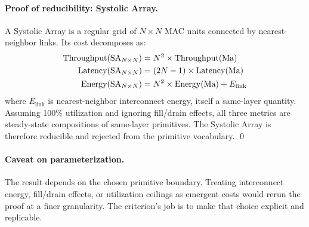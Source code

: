 \paragraph{Proof of reducibility: Systolic Array.} A Systolic Array \citep{kung1982} is a regular grid of $N \times N$ MAC units connected by nearest-neighbor links. Its cost decomposes as:
\begin{align}
\label{eq:systolic-proof}
\text{Throughput}(\text{SA}_{N \times N}) &= N^2 \times \text{Throughput}(\text{Ma}) \\
\text{Latency}(\text{SA}_{N \times N}) &= (2N - 1) \times \text{Latency}(\text{Ma}) \notag \\
\text{Energy}(\text{SA}_{N \times N}) &= N^2 \times \text{Energy}(\text{Ma}) + E_{\text{link}} \notag
\end{align}
where $E_{\text{link}}$ is nearest-neighbor interconnect energy, itself a same-layer quantity. Assuming 100\% utilization and ignoring fill/drain effects, all three metrics are steady-state compositions of same-layer primitives. The Systolic Array is therefore reducible and rejected from the primitive vocabulary. \qed

\paragraph{Caveat on parameterization.} The result depends on the chosen primitive boundary. Treating interconnect energy, fill/drain effects, or utilization ceilings as emergent costs would rerun the proof at a finer granularity. The criterion's job is to make that choice explicit and replicable.
